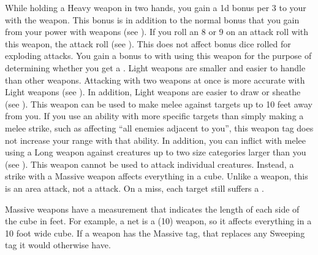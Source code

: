         While holding a Heavy weapon in two hands, you gain a \plus1d bonus per 3  to your  with the weapon.
        This bonus is in addition to the normal bonus that you gain from your power with weapons (see ).
         If you roll an 8 or 9 on an attack roll with this weapon, the attack roll  (see ).
        This does not affect bonus dice rolled for exploding attacks.
         You gain a  bonus to  with  using this weapon for the purpose of determining whether you get a .
         Light weapons are smaller and easier to handle than other weapons.
        Attacking with two weapons at once is more accurate with Light weapons (see ).
        In addition, Light weapons are easier to draw or sheathe (see ).
        \label{Long Weapon} This weapon can be used to make melee  against targets up to 10 feet away from you.
        If you use an ability with more specific targets than simply making a melee strike, such as affecting ``all enemies adjacent to you'', this weapon tag does not increase your range with that ability.
        In addition, you can inflict  with melee  using a Long weapon against creatures up to two size categories larger than you (see ).
         This weapon cannot be used to attack individual creatures.
        Instead, a strike with a Massive weapon affects everything in a cube.
        Unlike a  weapon, this is an area attack, not a  attack.
        On a miss, each target still suffers a .

        Massive weapons have a measurement that indicates the length of each side of the cube in feet.
        For example, a net is a  (10) weapon, so it affects everything in a 10 foot wide cube.
        If a weapon has the Massive tag, that replaces any Sweeping tag it would otherwise have.

